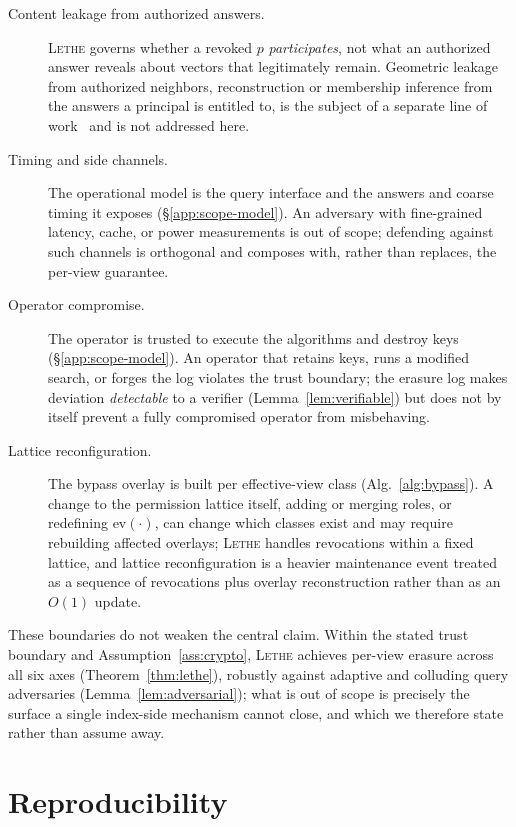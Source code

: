 \documentclass[sigconf, nonacm, review]{acmart}
\begin{document}
\begin{description}
\item[Content leakage from authorized answers.] \textsc{Lethe} governs whether
a revoked $p$ \emph{participates}, not what an authorized answer reveals about
vectors that legitimately remain. Geometric leakage from authorized neighbors, reconstruction or membership inference from the answers a principal is
entitled to, is the subject of a separate line of
work~\cite{DBLP:conf/ccs/SongR20,DBLP:conf/emnlp/MorrisKSR23,DBLP:conf/icissp/AndersonAG25}
and is not addressed here.
\item[Timing and side channels.] The operational model is the query interface
and the answers and coarse timing it exposes (\S\ref{app:scope-model}). An
adversary with fine-grained latency, cache, or power measurements is out of
scope; defending against such channels is orthogonal and composes with, rather
than replaces, the per-view guarantee.
\item[Operator compromise.] The operator is trusted to execute the algorithms
and destroy keys (\S\ref{app:scope-model}). An operator that retains keys, runs
a modified search, or forges the log violates the trust boundary; the erasure
log makes deviation \emph{detectable} to a verifier (Lemma~\ref{lem:verifiable})
but does not by itself prevent a fully compromised operator from misbehaving.
\item[Lattice reconfiguration.] The bypass overlay is built per effective-view
class (Alg.~\ref{alg:bypass}). A change to the permission lattice itself, adding or merging roles, or redefining $\mathrm{ev}(\cdot)$, can change which
classes exist and may require rebuilding affected overlays; \textsc{Lethe}
handles revocations within a fixed lattice, and lattice reconfiguration is a
heavier maintenance event treated as a sequence of revocations plus overlay
reconstruction rather than as an $O(1)$ update.
\end{description}

These boundaries do not weaken the central claim. Within the stated trust
boundary and Assumption~\ref{ass:crypto}, \textsc{Lethe} achieves per-view
erasure across all six axes (Theorem~\ref{thm:lethe}), robustly against
adaptive and colluding query adversaries (Lemma~\ref{lem:adversarial}); what is
out of scope is precisely the surface a single index-side mechanism cannot
close, and which we therefore state rather than assume away.


\section{Reproducibility}
\label{app:repro}
\end{document}
